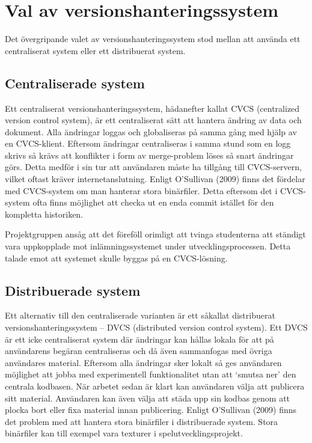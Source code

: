 \section{Val av versionshanteringssystem}

Det övergripande valet av versionshanteringssystem stod mellan att använda ett centraliserat system eller ett distribuerat system.

\subsection{Centraliserade system}

Ett centraliserat versionshanteringssystem, hädanefter kallat CVCS (centralized version control system), är ett centraliserat sätt att hantera ändring av data och dokument. Alla ändringar loggas och globaliseras på samma gång med hjälp av en CVCS-klient. Eftersom ändringar centraliseras i samma stund som en logg skrivs så krävs att konflikter i form av merge-problem löses så snart ändringar görs. Detta medför i sin tur att användaren måste ha tillgång till CVCS-servern, vilket oftast kräver internetanslutning.
Enligt O’Sullivan (2009) finns det fördelar med CVCS-system om man hanterar stora binärfiler. Detta eftersom det i CVCS-system ofta finns möjlighet att checka ut en enda commit istället för den kompletta historiken.

Projektgruppen ansåg att det föreföll orimligt att tvinga studenterna att ständigt vara uppkopplade mot inlämningssystemet under utvecklingsprocessen. Detta talade emot att systemet skulle byggas på en CVCS-lösning.

\subsection{Distribuerade system}

Ett alternativ till den centraliserade varianten är ett såkallat distribuerat versionshanteringssystem – DVCS (distributed version control system). 
Ett DVCS är ett icke centraliserat system där ändringar kan hållas lokala för att på användarens begäran centraliseras och då även sammanfogas med övriga användares material. Eftersom alla ändringar sker lokalt så ges användaren möjlighet att jobba med experimentell funktionalitet utan att `smutsa ner' den centrala kodbasen. När arbetet sedan är klart kan användaren välja att publicera sitt material. Användaren kan även välja att städa upp sin kodbas genom att  plocka bort eller fixa material innan publicering.
Enligt O’Sullivan (2009) finns det problem med att hantera stora binärfiler i distribuerade system. Stora binärfiler kan till exempel vara texturer i spelutvecklingsprojekt. 

